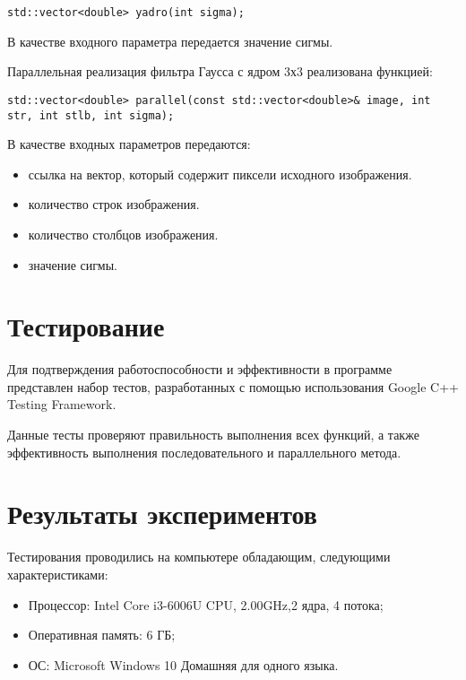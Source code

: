 \documentclass{report}
\begin{document}
\begin{lstlisting}
std::vector<double> yadro(int sigma);
\end{lstlisting}
\par В качестве входного параметра передается значение сигмы.
\par Параллельная реализация фильтра Гаусса с ядром 3х3 реализована функцией:
\begin{lstlisting}
std::vector<double> parallel(const std::vector<double>& image, int str, int stlb, int sigma);
\end{lstlisting}
\par В качестве входных параметров передаются:
\begin{itemize}
\item ссылка на вектор, который содержит пиксели исходного изображения.
\item количество строк изображения.
\item количество столбцов изображения.
\item значение сигмы.
\end{itemize}
\newpage

\section*{Тестирование}
Для подтверждения работоспособности и эффективности в программе представлен набор тестов, разработанных с помощью использования Google C++ Testing Framework.
\par Данные тесты проверяют правильность выполнения всех функций, а также эффективность выполнения последовательного и параллельного метода.
\newpage

\section*{Результаты экспериментов}
Тестирования проводились на компьютере обладающим, следующими характеристиками:

\begin{itemize}
\item Процессор: Intel Core i3-6006U CPU, 2.00GHz,2 ядра, 4 потока;
\item Оперативная память: 6 ГБ;
\item ОС: Microsoft Windows 10 Домашняя для одного языка.
\end{itemize}
\end{document}
